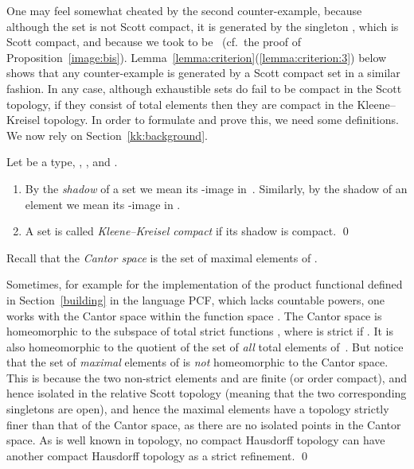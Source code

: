 \documentclass{LMCS}
\begin{document}
One may feel somewhat cheated by the second counter-example, because
although the set  is not Scott compact, it is generated by the
singleton , which is Scott compact, and because we took
 to be~ (cf.\ the proof of
Proposition~\ref{image:bis}).
Lemma~\ref{lemma:criterion}(\ref{lemma:criterion:3}) below shows that
any counter-example is generated by a Scott compact set in a similar
fashion.  In any case, although exhaustible sets do fail to be compact
in the Scott topology, if they consist of total elements then they are
compact in the Kleene--Kreisel topology.  In order to formulate and
prove this, we need some definitions. We now rely on
Section~\ref{kk:background}.
\begin{defi} 
  Let  be a type, , ,
   and . 
\begin{enumerate}
\item By the \emph{shadow} of a set  we mean its
  -image in~. 
  Similarly, by the shadow of an element  we mean its
  -image  in .

\item A set  is called \emph{Kleene--Kreisel compact}
  if its shadow is compact. \qed
\end{enumerate}
\end{defi}
Recall that the \emph{Cantor space} is the set  of
maximal elements of .
\begin{rem}
  Sometimes, for example for the implementation of the product
  functional defined in Section~\ref{building} in the language PCF,
  which lacks countable powers, one works with the Cantor space within
  the function space . The Cantor space is homeomorphic to
  the subspace of total strict functions ,
  where  is strict if .  It is also
  homeomorphic to the quotient of the set of \emph{all} total elements
  of~. But notice that the set of \emph{maximal} elements
  of  is \emph{not} homeomorphic to the Cantor
  space.  This is because the two non-strict elements  and  are finite (or order compact), and
  hence isolated in the relative Scott topology (meaning that the two
  corresponding singletons are open), and hence the maximal elements
  have a topology strictly finer than that of the Cantor space, as
  there are no isolated points in the Cantor space. As is well known
  in topology, no compact Hausdorff topology can have another compact
  Hausdorff topology as a strict refinement. \qed
\end{rem}
\end{document}
